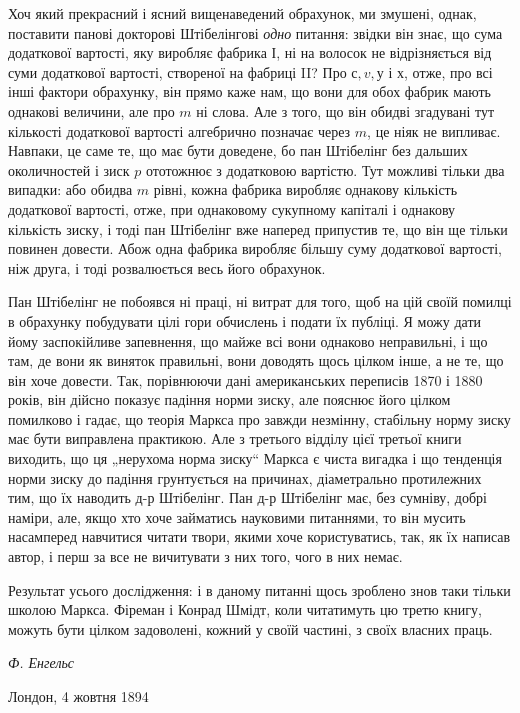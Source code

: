 
Хоч який прекрасний і ясний вищенаведений обрахунок, ми
змушені, однак, поставити панові докторові Штібелінгові \emph{одно}
питання: звідки він знає, що сума додаткової вартості, яку виробляє
фабрика І, ні на волосок не відрізняється від суми додаткової
вартості, створеної на фабриці II? Про $с, v, у$ і $х$, отже,
про всі інші фактори обрахунку, він прямо каже нам, що вони
для обох фабрик мають однакові величини, але про $m$ ні слова.
Але з того, що він обидві згадувані тут кількості додаткової
вартості алгебрично позначає через $m$, це ніяк не випливає.
Навпаки, це саме те, що має бути доведене, бо пан Штібелінг
без дальших околичностей і зиск $p$ ототожнює з додатковою
вартістю. Тут можливі тільки два випадки: або обидва $m$ рівні,
кожна фабрика виробляє однакову кількість додаткової вартості,
отже, при однаковому сукупному капіталі і однакову кількість
зиску, і тоді пан Штібелінг вже наперед припустив те, що він
ще тільки повинен довести. Абож одна фабрика виробляє більшу
суму додаткової вартості, ніж друга, і тоді розвалюється весь
його обрахунок.

Пан Штібелінг не побоявся ні праці, ні витрат для того, щоб
на цій своїй помилці в обрахунку побудувати цілі гори обчислень
і подати їх публіці. Я можу дати йому заспокійливе запевнення,
що майже всі вони однаково неправильні, і що там,
де вони як виняток правильні, вони доводять щось цілком інше,
а не те, що він хоче довести. Так, порівнюючи дані американських
переписів 1870 і 1880 років, він дійсно показує падіння
норми зиску, але пояснює його цілком помилково і гадає, що
теорія Маркса про завжди незмінну, стабільну норму зиску має
бути виправлена практикою. Але з третього відділу цієї третьої
книги виходить, що ця „нерухома норма зиску“ Маркса є чиста
вигадка і що тенденція норми зиску до падіння грунтується на
причинах, діаметрально протилежних тим, що їх наводить д-р
Штібелінг. Пан д-р Штібелінг має, без сумніву, добрі наміри,
але, якщо хто хоче займатись науковими питаннями, то він мусить
насамперед навчитися читати твори, якими хоче користуватись,
так, як їх написав автор, і перш за все не вичитувати
з них того, чого в них немає.

Результат усього дослідження: і в даному питанні щось
зроблено знов таки тільки школою Маркса. Фіреман і Конрад
Шмідт, коли читатимуть цю третю книгу, можуть бути цілком
задоволені, кожний у своїй частині, з своїх власних праць.
\begin{flushright}
  \emph{Ф. Енгельс}
\end{flushright}
Лондон, 4 жовтня 1894~
